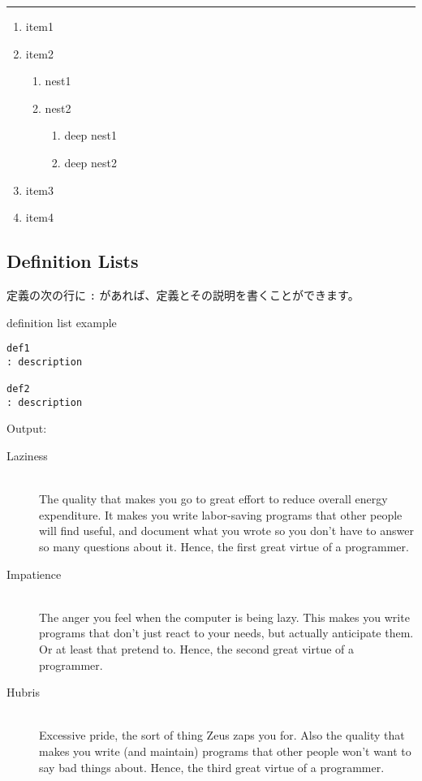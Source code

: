 \documentclass[a4j, titlepage]{jarticle}
\begin{document}
\begin{center}
\rule{3in}{0.4pt}
\end{center}

\begin{enumerate}
\item item1
\item item2


\begin{enumerate}
\item nest1
\item nest2


\begin{enumerate}
\item deep nest1
\item deep nest2
\end{enumerate}
\end{enumerate}
\item item3
\item item4
\end{enumerate}

\subsection{Definition Lists}

定義の次の行に {\tt :} があれば、定義とその説明を書くことができます。

\begin{itembox}[c]{definition list example}
\begin{verbatim}
def1
: description

def2
: description
\end{verbatim}
\end{itembox}

Output:

\begin{description}
\item[Laziness]\mbox{}\\ The quality that makes you go to great effort to reduce overall energy expenditure. It makes you write labor-saving programs that other people will find useful, and document what you wrote so you don't have to answer so many questions about it. Hence, the first great virtue of a programmer.



\item[Impatience]\mbox{}\\ The anger you feel when the computer is being lazy. This makes you write programs that don't just react to your needs, but actually anticipate them. Or at least that pretend to. Hence, the second great virtue of a programmer.



\item[Hubris]\mbox{}\\ Excessive pride, the sort of thing Zeus zaps you for. Also the quality that makes you write (and maintain) programs that other people won't want to say bad things about. Hence, the third great virtue of a programmer.
\end{description}
\end{document}
